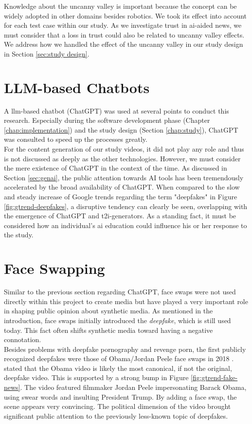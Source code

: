\documentclass[
  a4paper,  %
  twoside,  %
  bibliography=totoc,
  headsepline,
  cleardoublepage=empty,
  parskip=half,
  draft=false
]{scrbook}
\begin{document}
Knowledge about the uncanny valley is important because the concept can be widely adopted in other domains besides robotics. We took its effect into account for each test case within our study. As we investigate trust in \gls{ai}-aided news, we must consider that a loss in trust could also be related to uncanny valley effects. \\
We address how we handled the effect of the uncanny valley in our study design in Section \ref{sec:study design}.

\section{LLM-based Chatbots}
A \gls{llm}-based chatbot (ChatGPT) was used at several points to conduct this research. Especially during the software development phase (Chapter \ref{chap:implementation}) and the study design (Section \ref{chap:study}), ChatGPT was consulted to speed up the processes greatly. \\ 
For the content generation of our study videos, it did not play any role and thus is not discussed as deeply as the other technologies. However, we must consider the mere existence of ChatGPT in the context of the time. As discussed in Section \ref{sec:genai}, the public attention towards AI tools has been tremendously accelerated by the broad availability of ChatGPT. When compared to the slow and steady increase of Google trends regarding the term "deepfakes" in Figure \ref{fig:gtrend-deepfakes}, a disruptive tendency can clearly be seen, overlapping with the emergence of ChatGPT and \gls{t2i}-generators. As a standing fact, it must be considered how an individual's \gls{ai} education could influence his or her response to the study.

\section{Face Swapping}
\label{sec:face-swapping}
Similar to the previous section regarding ChatGPT, face swaps were not used directly within this project to create media but have played a very important role in shaping public opinion about synthetic media. As mentioned in the introduction, face swaps initially introduced the \textit{deepfake}, which is still used today. This fact often shifts synthetic media toward having a negative connotation. \\
Besides problems with deepfake pornography and revenge porn, the first publicly recognized deepfakes were those of Obama/Jordan Peele face swaps in 2018 \cite{vincentWatchJordanPeele2018}. \citet{hancockSocialImpactDeepfakes2021} stated that the Obama video is likely the most canonical, if not the original, deepfake video. This is supported by a strong bump in Figure \ref{fig:gtrend-fake-news}. The video featured filmmaker Jordan Peele impersonating Barack Obama, using swear words and insulting President Trump. By adding a face swap, the scene appears very convincing. The political dimension of the video brought significant public attention to the previously less-known topic of deepfakes.
\end{document}
